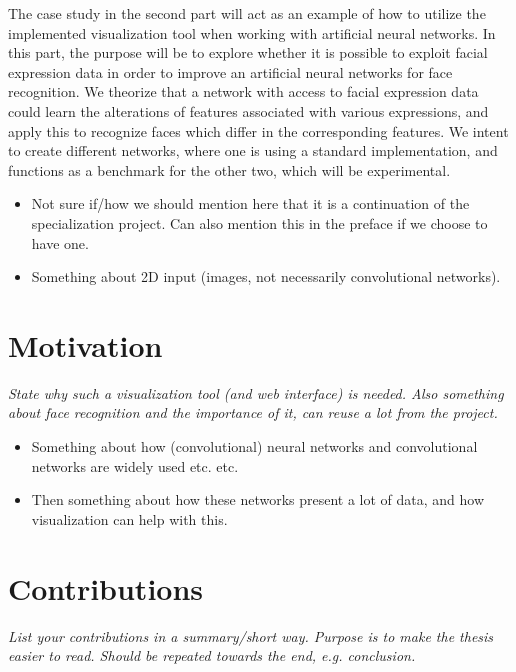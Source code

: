 \noindent The case study in the second part will act as an example of how to utilize the implemented visualization tool when working with artificial neural networks. In this part, the purpose will be to explore whether it is possible to exploit facial expression data in order to improve an artificial neural networks for face recognition. We theorize that a network with access to facial expression data could learn the alterations of features associated with various expressions, and apply this to recognize faces which differ in the corresponding features. We intent to create different networks, where one is using a standard implementation, and functions as a benchmark for the other two, which will be experimental.

\begin{itemize}
    \item Not sure if/how we should mention here that it is a continuation of the specialization project. Can also mention this in the preface if we choose to have one.
    \item Something about 2D input (images, not necessarily convolutional networks).
\end{itemize}

\section{Motivation}

\textit{State why such a visualization tool (and web interface) is needed. Also something about face recognition and the importance of it, can reuse a lot from the project.}

\begin{itemize}
    \item Something about how (convolutional) neural networks and convolutional networks are widely used etc. etc.
    \item Then something about how these networks present a lot of data, and how visualization can help with this.
\end{itemize}

\section{Contributions}

\textit{List your contributions in a summary/short way. Purpose is to make the thesis easier to read. Should be repeated towards the end, e.g. conclusion.} \\

